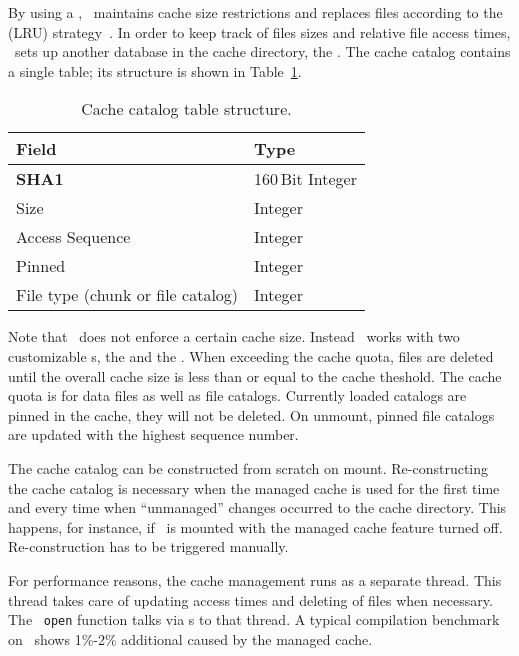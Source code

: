 By using a , \cvmfs\ maintains cache size restrictions and replaces files according to the  (LRU) strategy~\cite{lru06}.
In order to keep track of files sizes and relative file access times, \cvmfs\ sets up another  database in the cache directory, the .
The cache catalog contains a single table; its structure is shown in Table~\ref{tab:cachecatalog}.
\begin{table}
	\begin{center}
		\begin{tabular}{l|l}
			\bf Field & \bf Type \\\hline
			\bf SHA1 & 160\,Bit Integer \\
			Size & Integer \\
			Access Sequence & Integer \\
			Pinned & Integer \\
			File type (chunk or file catalog) & Integer
		\end{tabular}
	\end{center}
	\caption{Cache catalog table structure.}
	\label{tab:cachecatalog}
\end{table}

Note that \cvmfs\ does not enforce a certain cache size.
Instead \cvmfs\ works with two customizable s, the  and the .
When exceeding the cache quota, files are deleted until the overall cache size is less than or equal to the cache theshold.
The cache quota is for data files as well as file catalogs.
Currently loaded catalogs are pinned in the cache, \ie they will not be deleted.
On unmount, pinned file catalogs are updated with the highest sequence number.

The cache catalog can be constructed from scratch on mount.
Re-constructing the cache catalog is necessary when the managed cache is used for the first time and every time when ``unmanaged'' changes occurred to the cache directory.
This happens, for instance, if \cvmfs\ is mounted with the managed cache feature turned off.
Re-construction has to be triggered manually.

For performance reasons, the cache management runs as a separate thread.
This thread takes care of updating access times and deleting of files when necessary.
The \cvmfs\ \texttt{open} function talks via s to that thread.
A typical compilation benchmark on \cvmfs\ shows 1\%-2\% additional  caused by the managed cache.


